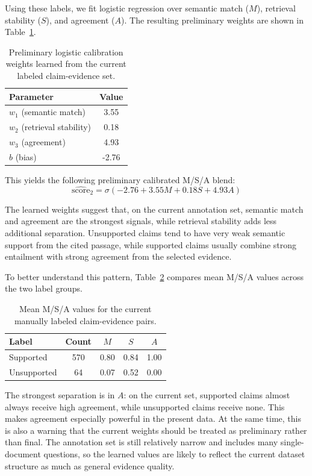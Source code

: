 \documentclass[10pt]{article}
\begin{document}
Using these labels, we fit logistic regression over semantic match
($M$), retrieval stability ($S$), and agreement ($A$). The resulting
preliminary weights are shown in Table~\ref{tab:weights}.

\begin{table}[t]
\centering
\small
\begin{tabular}{lc}
\toprule
Parameter & Value \\
\midrule
$w_1$ (semantic match) & 3.55 \\
$w_2$ (retrieval stability) & 0.18 \\
$w_3$ (agreement) & 4.93 \\
$b$ (bias) & -2.76 \\
\bottomrule
\end{tabular}
\caption{Preliminary logistic calibration weights learned from the
current labeled claim-evidence set.}
\label{tab:weights}
\end{table}

This yields the following preliminary calibrated M/S/A blend:
\begin{equation}
\widehat{\text{score}}_2 =
\sigma(-2.76 + 3.55M + 0.18S + 4.93A)
\end{equation}

The learned weights suggest that, on the current annotation set,
semantic match and agreement are the strongest signals, while retrieval
stability adds less additional separation. Unsupported claims tend to
have very weak semantic support from the cited passage, while supported
claims usually combine strong entailment with strong agreement from the
selected evidence.

To better understand this pattern, Table~\ref{tab:msa-by-label}
compares mean M/S/A values across the two label groups.

\begin{table}[t]
\centering
\small
\begin{tabular}{lcccc}
\toprule
Label & Count & $M$ & $S$ & $A$ \\
\midrule
Supported & 570 & 0.80 & 0.84 & 1.00 \\
Unsupported & 64 & 0.07 & 0.52 & 0.00 \\
\bottomrule
\end{tabular}
\caption{Mean M/S/A values for the current manually labeled
claim-evidence pairs.}
\label{tab:msa-by-label}
\end{table}

The strongest separation is in $A$: on the current set, supported
claims almost always receive high agreement, while unsupported claims
receive none. This makes agreement especially powerful in the present
data. At the same time, this is also a warning that the current
weights should be treated as preliminary rather than final. The
annotation set is still relatively narrow and includes many
single-document questions, so the learned values are likely to reflect
the current dataset structure as much as general evidence quality.
\end{document}
